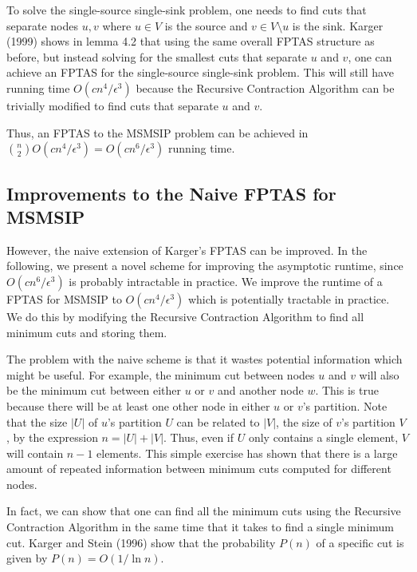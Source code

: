 \documentclass{article}
\theoremstyle{plain}
\begin{document}
To solve the single-source single-sink problem, one needs to find cuts that separate nodes $u,v$ where $u \in V$ is the source and $v \in V \setminus u$ is the sink. Karger (1999) shows in lemma 4.2 that using the same overall FPTAS structure as before, but instead solving for the smallest cuts that separate $u$ and $v$, one can achieve an FPTAS for the single-source single-sink problem. This will still have running time $O(c n^4 / \epsilon^3)$ because the Recursive Contraction Algorithm can be trivially modified to find cuts that separate $u$ and $v$.

Thus, an FPTAS to the MSMSIP problem can be achieved in ${n \choose 2} O(c n^4 / \epsilon^3) = O(c n^6 /\epsilon^3)$ running time.

\subsection{Improvements to the Naive FPTAS for MSMSIP}

However, the naive extension of Karger's FPTAS can be improved. In the following, we present a novel scheme for improving the asymptotic runtime, since $O(c n^6 / \epsilon^3)$ is probably intractable in practice. We improve the runtime of a FPTAS for MSMSIP to $O(c n^4 / \epsilon^3)$ which is potentially tractable in practice. We do this by modifying the Recursive Contraction Algorithm to find all minimum cuts and storing them.

The problem with the naive scheme is that it wastes potential information which might be useful. For example, the minimum cut between nodes $u$ and $v$ will also be the minimum cut between either $u$ or $v$ and another node $w$. This is true because there will be at least one other node in either $u$ or $v$'s partition. Note that the size $|U|$ of $u$'s partition $U$ can be related to $|V|$, the size of $v$'s partition $V$, by the expression $n = |U| + |V|$. Thus, even if $U$ only contains a single element, $V$ will contain $n-1$ elements. This simple exercise has shown that there is a large amount of repeated information between minimum cuts computed for different nodes.

In fact, we can show that one can find all the minimum cuts using the Recursive Contraction Algorithm in the same time that it takes to find a single minimum cut. Karger and Stein (1996) show that the probability $P(n)$ of a specific cut is given by $P(n) = O(1/ \ln n)$. 
\end{document}
